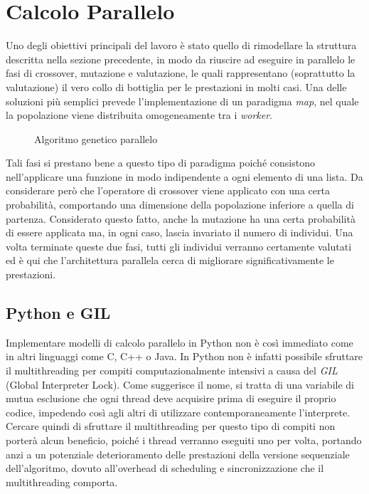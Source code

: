 \section{Calcolo Parallelo}\label{sec: parallel}

Uno degli obiettivi principali del lavoro è stato quello di rimodellare la
struttura descritta nella sezione precedente, in modo da riuscire ad eseguire in
parallelo le fasi di crossover, mutazione e valutazione, le quali rappresentano
(soprattutto la valutazione) il vero collo di bottiglia per le prestazioni in
molti casi. Una delle soluzioni più semplici prevede l'implementazione di un
paradigma \textit{map}, nel quale la popolazione viene distribuita omogeneamente
tra i \textit{worker}.

\begin{figure}[H]
	\centering
	
	\caption{Algoritmo genetico parallelo}
	\label{fig: parallel_ga}
\end{figure}

Tali fasi si prestano bene a questo tipo di paradigma poiché consistono
nell'applicare una funzione in modo indipendente a ogni elemento di una lista.
Da considerare però che l'operatore di crossover viene applicato con una certa
probabilità, comportando una dimensione della popolazione inferiore a quella di
partenza. Considerato questo fatto, anche la mutazione ha una certa probabilità
di essere applicata ma, in ogni caso, lascia invariato il numero di individui.
Una volta terminate queste due fasi, tutti gli individui verranno certamente
valutati ed è qui che l'architettura parallela cerca di migliorare
significativamente le prestazioni.

\subsection{Python e GIL}\label{sec: parallel_GIL}

Implementare modelli di calcolo parallelo in Python non è così immediato come
in altri linguaggi come C, C++ o Java. In Python non è infatti possibile
sfruttare il multithreading per compiti computazionalmente intensivi a causa
del \textit{GIL} (Global Interpreter Lock). Come suggerisce il nome, si tratta
di una variabile di mutua esclusione che ogni thread deve acquisire prima di
eseguire il proprio codice, impedendo così agli altri di utilizzare
contemporaneamente l'interprete. Cercare quindi di sfruttare il multithreading
per questo tipo di compiti non porterà alcun beneficio, poiché i thread verranno
eseguiti uno per volta, portando anzi a un potenziale deterioramento delle
prestazioni della versione sequenziale dell'algoritmo, dovuto all'overhead di
scheduling e sincronizzazione che il multithreading comporta.

